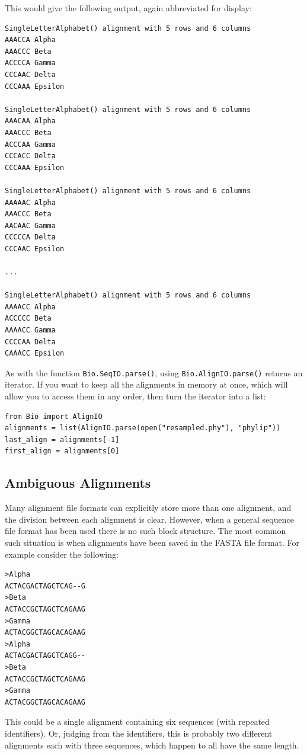 \documentclass{report}
\begin{document}
\noindent This would give the following output, again abbreviated for display:

\begin{verbatim}
SingleLetterAlphabet() alignment with 5 rows and 6 columns
AAACCA Alpha
AAACCC Beta
ACCCCA Gamma
CCCAAC Delta
CCCAAA Epsilon

SingleLetterAlphabet() alignment with 5 rows and 6 columns
AAACAA Alpha
AAACCC Beta
ACCCAA Gamma
CCCACC Delta
CCCAAA Epsilon

SingleLetterAlphabet() alignment with 5 rows and 6 columns
AAAAAC Alpha
AAACCC Beta
AACAAC Gamma
CCCCCA Delta
CCCAAC Epsilon

...

SingleLetterAlphabet() alignment with 5 rows and 6 columns
AAAACC Alpha
ACCCCC Beta
AAAACC Gamma
CCCCAA Delta
CAAACC Epsilon
\end{verbatim}

As with the function \verb|Bio.SeqIO.parse()|, using \verb|Bio.AlignIO.parse()| returns an iterator.
If you want to keep all the alignments in memory at once, which will allow you to access them in any order, then turn the iterator into a list:

\begin{verbatim}
from Bio import AlignIO
alignments = list(AlignIO.parse(open("resampled.phy"), "phylip"))
last_align = alignments[-1]
first_align = alignments[0]
\end{verbatim}

\subsection{Ambiguous Alignments}
\label{sec:AlignIO-count-argument}
Many alignment file formats can explicitly store more than one alignment, and the division between each alignment is clear.  However, when a general sequence file format has been used there is no such block structure.  The most common such situation is when alignments have been saved in the FASTA file format.  For example consider the following:

\begin{verbatim}
>Alpha
ACTACGACTAGCTCAG--G
>Beta
ACTACCGCTAGCTCAGAAG
>Gamma
ACTACGGCTAGCACAGAAG
>Alpha
ACTACGACTAGCTCAGG--
>Beta
ACTACCGCTAGCTCAGAAG
>Gamma
ACTACGGCTAGCACAGAAG
\end{verbatim}

\noindent This could be a single alignment containing six sequences (with repeated identifiers).  Or, judging from the identifiers, this is probably two different alignments each with three sequences, which happen to all have the same length.
\end{document}
